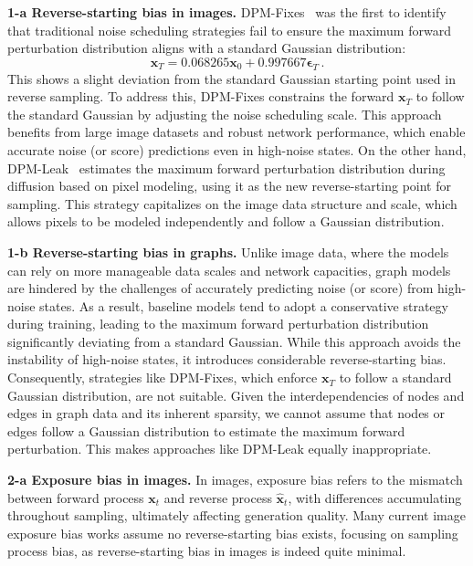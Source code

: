 \documentclass{article}
\newcommand{\x}{{{\bm x}}}
\newcommand{\EPS}{{\bm\epsilon}}
\begin{document}
\textbf{1-a Reverse-starting bias in images.} DPM-Fixes~\citep{lin2024common} was the first to identify that traditional noise scheduling strategies fail to ensure the maximum forward perturbation distribution aligns with a standard Gaussian distribution:
\begin{equation}
\x_T=0.068265\x_0+0.997667\EPS_T\,.
\end{equation}
This shows a slight deviation from the standard Gaussian starting point used in reverse sampling. To address this, DPM-Fixes constrains the forward $\x_T$ to follow the standard Gaussian by adjusting the noise scheduling scale. This approach benefits from large image datasets and robust network performance, which enable accurate noise (or score) predictions even in high-noise states. On the other hand, DPM-Leak~\citep{everaert2024exploiting} estimates the maximum forward perturbation distribution during diffusion based on pixel modeling, using it as the new reverse-starting point for sampling. This strategy capitalizes on the image data structure and scale, which allows pixels to be modeled independently and follow a Gaussian distribution.

\textbf{1-b Reverse-starting bias in graphs.} Unlike image data, where the models can rely on more manageable data scales and network capacities, graph models are hindered by the challenges of accurately predicting noise (or score) from high-noise states. As a result, baseline models tend to adopt a conservative strategy during training, leading to the maximum forward perturbation distribution significantly deviating from a standard Gaussian. While this approach avoids the instability of high-noise states, it introduces considerable reverse-starting bias. Consequently, strategies like DPM-Fixes, which enforce $\x_T$ to follow a standard Gaussian distribution, are not suitable. Given the interdependencies of nodes and edges in graph data and its inherent sparsity, we cannot assume that nodes or edges follow a Gaussian distribution to estimate the maximum forward perturbation. This makes approaches like DPM-Leak equally inappropriate.

\textbf{2-a Exposure bias in images.} In images, exposure bias refers to the mismatch between forward process $\x_t$ and reverse process $\hat{\x}_t$, with differences accumulating throughout sampling, ultimately affecting generation quality. Many current image exposure bias works assume no reverse-starting bias exists, focusing on sampling process bias, as reverse-starting bias in images is indeed quite minimal.
\end{document}
